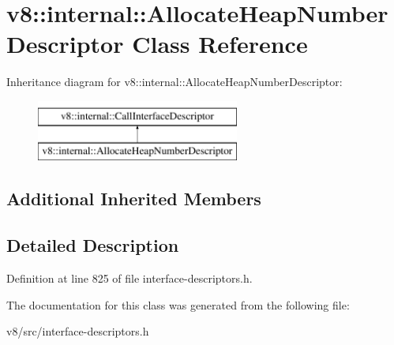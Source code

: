 \hypertarget{classv8_1_1internal_1_1AllocateHeapNumberDescriptor}{}\section{v8\+:\+:internal\+:\+:Allocate\+Heap\+Number\+Descriptor Class Reference}
\label{classv8_1_1internal_1_1AllocateHeapNumberDescriptor}
Inheritance diagram for v8\+:\+:internal\+:\+:Allocate\+Heap\+Number\+Descriptor\+:\begin{figure}[H]
\begin{center}
\leavevmode
\includegraphics[height=2.000000cm]{classv8_1_1internal_1_1AllocateHeapNumberDescriptor}
\end{center}
\end{figure}
\subsection*{Additional Inherited Members}


\subsection{Detailed Description}


Definition at line 825 of file interface-\/descriptors.\+h.



The documentation for this class was generated from the following file\+:\begin{DoxyCompactItemize}
\item 
v8/src/interface-\/descriptors.\+h\end{DoxyCompactItemize}
